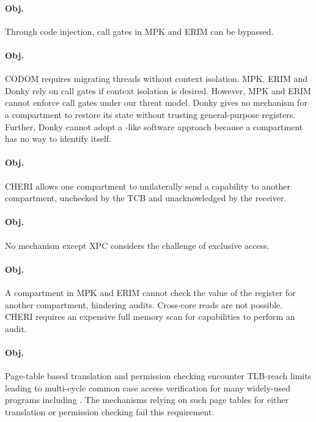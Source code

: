 \paragraph{Obj. }
Through code injection, call gates in MPK and ERIM can be bypassed.

\paragraph{Obj. }
CODOM requires migrating threads without context isolation.
MPK, ERIM and Donky rely on call gates if context isolation is desired.
However, MPK and ERIM cannot enforce call gates under our threat model.
Donky gives no mechanism for a compartment to restore its state without
trusting general-purpose registers. 
Further, Donky cannot adopt a \seccells-like software approach because a 
compartment has no way to identify itself.

\paragraph{Obj. }
CHERI allows one compartment to unilaterally send a capability to another compartment, 
unchecked by the TCB and unacknowledged by the receiver.

\paragraph{Obj. }
No mechanism except XPC considers the challenge of exclusive access.

\paragraph{Obj. }
A compartment in MPK and ERIM cannot check the value of the 
register for another compartment, hindering audits.
Cross-core  reads are not possible.
CHERI requires an expensive full memory scan for capabilities to perform
an audit.

\paragraph{Obj. }
Page-table based translation and permission checking encounter TLB-reach
limits leading to multi-cycle common case access verification for many
widely-used programs including . The mechanisms relying on
such page tables for either translation or permission checking fail this
requirement.

